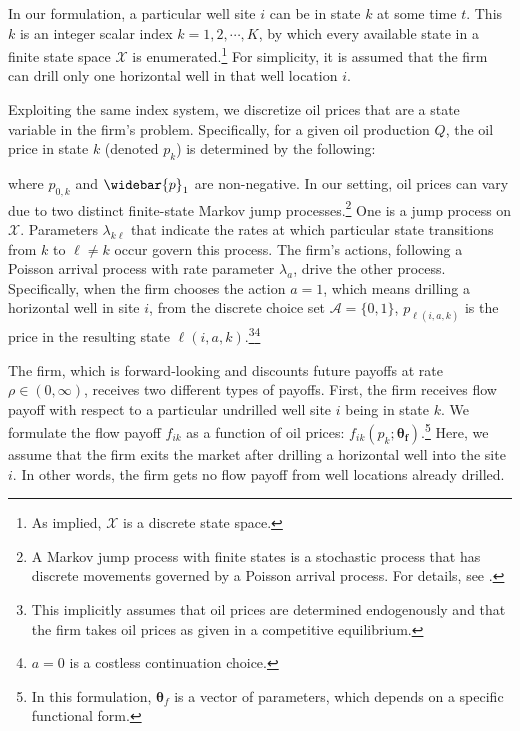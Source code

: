 In our formulation, a particular well site $i$ can be in state $k$ at some time $t$. This $k$ is an integer scalar index $k = 1, 2, \cdots, K$, by which every available state in a finite state space $\mathcal{X}$ is enumerated.\footnote{As implied, $\mathcal{X}$ is a discrete state space.} For simplicity, it is assumed that the firm can drill only one horizontal well in that well location $i$. 

Exploiting the same index system, we discretize oil prices that are a state variable in the firm's problem. Specifically, for a given oil production $Q$, the oil price in state $k$ (denoted $p_{k}$) is determined by the following:

where $p_{0,k}$ and $\widebar{p}_{1}$ are non-negative. In our setting, oil prices can vary due to two distinct finite-state Markov jump processes.\footnote{A Markov jump process with finite states is a stochastic process that has discrete movements governed by a Poisson arrival process. For details, see \cite{Time-Discretization-of-Markov-Chains_Doytchinov-and-Irby_2010}.} One is a jump process on $\mathcal{X}$. Parameters $\lambda_{k\ell}$ that indicate the rates at which particular state transitions from $k$ to $\ell \neq k$ occur govern this process. The firm's actions, following a Poisson arrival process with rate parameter $\lambda_{a}$, drive the other process. Specifically, when the firm chooses the action $a = 1$, which means drilling a horizontal well in site $i$, from the discrete choice set $\mathcal{A} = \{ 0, 1 \}$, $p_{\ell(i, a, k)}$ is the price in the resulting state $\ell(i, a, k)$.\footnote{This implicitly assumes that oil prices are determined endogenously and that the firm takes oil prices as given in a competitive equilibrium.}\footnote{$a = 0$ is a costless continuation choice.}

The firm, which is forward-looking and discounts future payoffs at rate $\rho \in (0, \infty)$, receives two different types of payoffs. First, the firm receives flow payoff with respect to a particular undrilled well site $i$ being in state $k$. We formulate the flow payoff $f_{ik}$ as a function of oil prices: $f_{ik} (p_{k}; \boldsymbol{\theta_{f}})$.\footnote{In this formulation, $\boldsymbol{\theta}_{f}$ is a vector of parameters, which depends on a specific functional form.} Here, we assume that the firm exits the market after drilling a horizontal well into the site $i$. In other words, the firm gets no flow payoff from well locations already drilled. 

